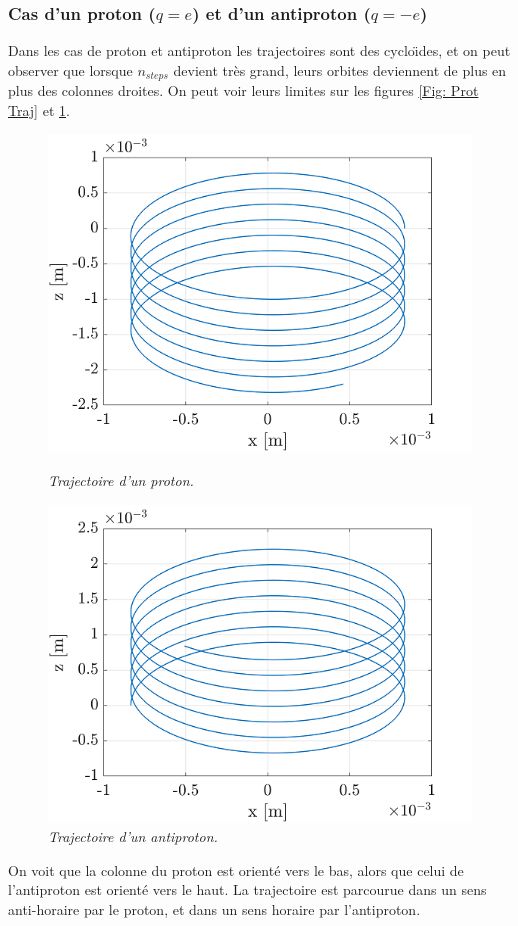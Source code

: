 \documentclass[a4paper,12pt,twoside]{article}
\begin{document}
\subsubsection{Cas d'un proton ($q = e$) et d'un antiproton ($q = -e$)}
Dans les cas de proton et antiproton les trajectoires sont des cyclo\"\i des, et on peut observer que lorsque $n_{steps}$ devient tr\`es grand, leurs orbites deviennent de plus en plus des colonnes droites. On peut voir leurs limites sur les figures \ref{Fig: Prot Traj} et \ref{Fig: Anti Traj}.
\begin{figure}[h]
				\begin{minipage}[c]{.46\linewidth}
					\centering
					\includegraphics[scale = 0.6]{final_traj_prot.png}
					\caption{\em\label{Fig: Prot Traj} Trajectoire d'un proton.}
				\end{minipage}
				\hfill%
				\begin{minipage}[c]{.46\linewidth}
					\centering
					\includegraphics[scale = 0.6]{final_traj_antiprot.png}
					\caption{\em\label{Fig: Anti Traj} Trajectoire d'un antiproton.}
				\end{minipage}
			\end{figure}
On voit que la colonne du proton est orient\'e vers le bas, alors que celui de l'antiproton est orient\'e vers le haut. La trajectoire est parcourue dans un sens anti-horaire par le proton, et dans un sens horaire par l'antiproton.
\end{document}
